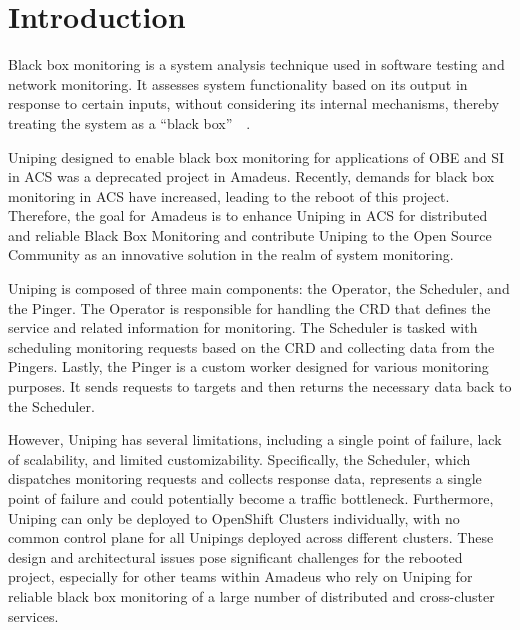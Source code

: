 
\chapter{Introduction}\label{chapter:introduction}

Black box monitoring is a system analysis technique used in software testing and network monitoring. It assesses system functionality based on its output in response to certain inputs, without considering its internal mechanisms, thereby treating the system as a “black box”~\parencite{beizer_black_1996}~\parencite{hierons_software_2006}. 

Uniping designed to enable black box monitoring for applications of \ac{OBE} and \ac{SI} in \ac{ACS} was a deprecated project in Amadeus. Recently, demands for black box monitoring in \ac{ACS} have increased, leading to the reboot of this project. Therefore, the goal for Amadeus is to enhance Uniping in \ac{ACS} for distributed and reliable Black Box Monitoring and contribute Uniping to the Open Source Community as an innovative solution in the realm of system monitoring. 

Uniping is composed of three main components: the Operator, the Scheduler, and the Pinger. The Operator is responsible for handling the \ac{CRD} that defines the service and related information for monitoring. The Scheduler is tasked with scheduling monitoring requests based on the \ac{CRD} and collecting data from the Pingers. Lastly, the Pinger is a custom worker designed for various monitoring purposes. It sends requests to targets and then returns the necessary data back to the Scheduler.

However, Uniping has several limitations, including a single point of failure, lack of scalability, and limited customizability. Specifically, the Scheduler, which dispatches monitoring requests and collects response data, represents a single point of failure and could potentially become a traffic bottleneck. Furthermore, Uniping can only be deployed to OpenShift Clusters individually, with no common control plane for all Unipings deployed across different clusters. These design and architectural issues pose significant challenges for the rebooted project, especially for other teams within Amadeus who rely on Uniping for reliable black box monitoring of a large number of distributed and cross-cluster services. 

